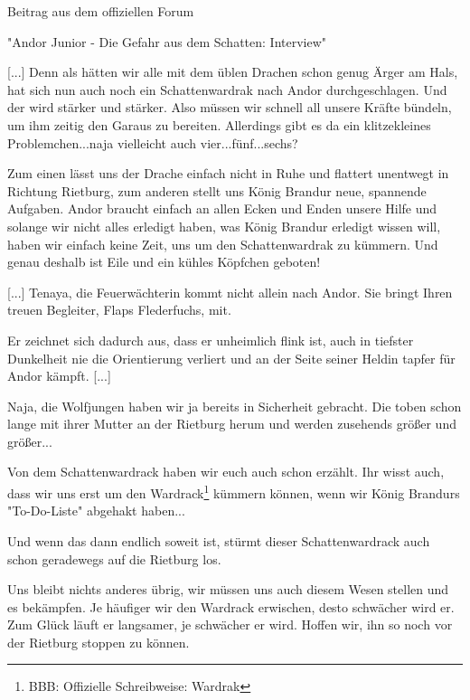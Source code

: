 \documentclass[10pt, a4paper, oneside]{book}
\begin{document}
\begin{multicols}{2}
\begin{center}
    Beitrag aus dem offiziellen Forum

    "Andor Junior - Die Gefahr aus dem Schatten: Interview"
\end{center}

[...] Denn als hätten wir alle mit dem üblen Drachen schon genug Ärger am Hals, hat sich nun auch noch ein Schattenwardrak nach Andor durchgeschlagen. Und der wird stärker und stärker. Also müssen wir schnell all unsere Kräfte bündeln, um ihm zeitig den Garaus zu bereiten. Allerdings gibt es da ein klitzekleines Problemchen...naja vielleicht auch vier...fünf...sechs?

Zum einen lässt uns der Drache einfach nicht in Ruhe und flattert unentwegt in Richtung Rietburg, zum anderen stellt uns König Brandur neue, spannende Aufgaben. Andor braucht einfach an allen Ecken und Enden unsere Hilfe und solange wir nicht alles erledigt haben, was König Brandur erledigt wissen will, haben wir einfach keine Zeit, uns um den Schattenwardrak zu kümmern. Und genau deshalb ist Eile und ein kühles Köpfchen geboten!

[...] Tenaya, die Feuerwächterin kommt nicht allein nach Andor. Sie bringt Ihren treuen Begleiter, Flaps Flederfuchs, mit.

Er zeichnet sich dadurch aus, dass er unheimlich flink ist, auch in tiefster Dunkelheit nie die Orientierung verliert und an der Seite seiner Heldin tapfer für Andor kämpft. [...]

Naja, die Wolfjungen haben wir ja bereits in Sicherheit gebracht. Die toben schon lange mit ihrer Mutter an der Rietburg herum und werden zusehends größer und größer...

Von dem Schattenwardrack haben wir euch auch schon erzählt. Ihr wisst auch, dass wir uns erst um den Wardrack\footnote{BBB: Offizielle Schreibweise: Wardrak} kümmern können, wenn wir König Brandurs "To-Do-Liste" abgehakt haben...

Und wenn das dann endlich soweit ist, stürmt dieser Schattenwardrack auch schon geradewegs auf die Rietburg los.

Uns bleibt nichts anderes übrig, wir müssen uns auch diesem Wesen stellen und es bekämpfen. Je häufiger wir den Wardrack erwischen, desto schwächer wird er. Zum Glück läuft er langsamer, je schwächer er wird. Hoffen wir, ihn so noch vor der Rietburg stoppen zu können.



\end{multicols}
\end{document}
